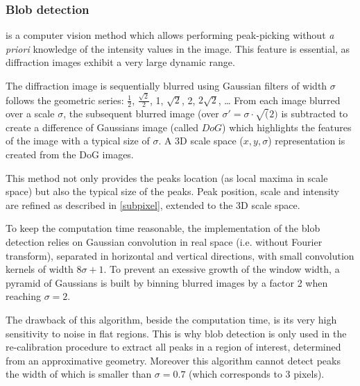\documentclass{iucr}
\begin{document}
\subsubsection{Blob detection}
\label{blob}
is a computer vision method which allows performing peak-picking without
\textit{a priori} knowledge of the intensity values in the image.
This feature is essential, as diffraction images exhibit a very large
dynamic range.

The diffraction image is sequentially blurred using Gaussian filters of
width $\sigma$ follows the geometric series: $\frac{1}{2}$,
$\frac{\sqrt{2}}{2}$, 1, $\sqrt{2}$, 2, $2\sqrt{2}$, \ldots
From each image blurred over a scale $\sigma$, the subsequent
blurred image (over $\sigma'=\sigma\cdot\sqrt(2)$
is subtracted to create a difference of Gaussians
image (called $DoG$) which highlights the features of the image with a typical
size of $\sigma$.
A 3D scale space ($x,y,\sigma$) representation is created from the DoG
images.

This method  not only provides the peaks location (as local maxima in
scale space) but also the typical size of the peaks.
Peak position, scale and intensity are refined as described in
\ref{subpixel}, extended to the 3D scale space.

To keep the computation time reasonable, the implementation of the blob
detection relies on Gaussian convolution in real space (i.e. without Fourier
transform), separated in horizontal and vertical directions, with small
convolution kernels of width $8 \sigma +1$.
To prevent an exessive growth of the window width, a pyramid
of Gaussians is built by binning blurred images by a factor 2 when reaching
$\sigma=2$.

The drawback of this algorithm, beside the computation time, is its very high
sensitivity to noise in flat regions.
This is why blob detection is only used in the re-calibration procedure to
extract all peaks in a region of interest, determined from an
approximative geometry.
Moreover this algorithm cannot detect peaks the width of which is smaller than
$\sigma=0.7$ (which corresponds to 3 pixels).
\end{document}
